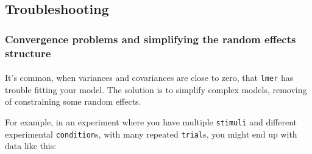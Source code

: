 \documentclass[]{article}
\newenvironment{Shaded}{\begin{snugshade}}{\end{snugshade}}
\newcommand{\CommentTok}[1]{\textcolor[rgb]{0.56,0.35,0.01}{\textit{#1}}}
\newcommand{\DecValTok}[1]{\textcolor[rgb]{0.00,0.00,0.81}{#1}}
\newcommand{\ErrorTok}[1]{\textcolor[rgb]{0.64,0.00,0.00}{\textbf{#1}}}
\newcommand{\FloatTok}[1]{\textcolor[rgb]{0.00,0.00,0.81}{#1}}
\newcommand{\KeywordTok}[1]{\textcolor[rgb]{0.13,0.29,0.53}{\textbf{#1}}}
\newcommand{\NormalTok}[1]{#1}
\newcommand{\OperatorTok}[1]{\textcolor[rgb]{0.81,0.36,0.00}{\textbf{#1}}}
\newcommand{\StringTok}[1]{\textcolor[rgb]{0.31,0.60,0.02}{#1}}
\let\oldparagraph\paragraph
\renewcommand{\paragraph}[1]{\oldparagraph{#1}\mbox{}}
\begin{document}
\hypertarget{troubleshooting-multilevel-models}{%
\subsection*{Troubleshooting}\label{troubleshooting-multilevel-models}}

\hypertarget{simplifying-mixed-models}{%
\subsubsection*{Convergence problems and simplifying the random effects structure}\label{simplifying-mixed-models}}

\hypertarget{controlling-lmer-covariances}{%
\paragraph{}\label{controlling-lmer-covariances}}

It's common, when variances and covariances are close to zero, that \texttt{lmer} has
trouble fitting your model. The solution is to simplify complex models, removing
of constraining some random effects.

For example, in an experiment where you have multiple \texttt{stimuli} and different
experimental \texttt{condition}s, with many repeated \texttt{trial}s, you might end up with
data like this:

\begin{Shaded}
\end{Shaded}
\end{document}
